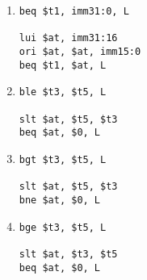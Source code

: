\documentclass[12pt]{article}
\begin{document}
\begin{enumerate}
\item
\begin{verbatim}
beq $t1, imm31:0, L

lui $at, imm31:16
ori $at, $at, imm15:0
beq $t1, $at, L
\end{verbatim}

\item
\begin{verbatim}
ble $t3, $t5, L

slt $at, $t5, $t3
beq $at, $0, L
\end{verbatim}

\item
\begin{verbatim}
bgt $t3, $t5, L

slt $at, $t5, $t3
bne $at, $0, L
\end{verbatim}

\item
\begin{verbatim}
bge $t3, $t5, L

slt $at, $t3, $t5
beq $at, $0, L
\end{verbatim}
\end{enumerate}
\end{document}
